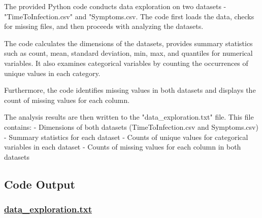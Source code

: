 \documentclass[11pt]{article}
\begin{document}
The provided Python code conducts data exploration on two datasets - "TimeToInfection.csv" and "Symptoms.csv. The code first loads the data, checks for missing files, and then proceeds with analyzing the datasets.

The code calculates the dimensions of the datasets, provides summary statistics such as count, mean, standard deviation, min, max, and quantiles for numerical variables. It also examines categorical variables by counting the occurrences of unique values in each category.

Furthermore, the code identifies missing values in both datasets and displays the count of missing values for each column.

The analysis results are then written to the "data\_exploration.txt" file. This file contains:
- Dimensions of both datasets (TimeToInfection.csv and Symptoms.csv)
- Summary statistics for each dataset
- Counts of unique values for categorical variables in each dataset
- Counts of missing values for each column in both datasets

\subsection{Code Output}\hypertarget{file-data-exploration-txt}{}

\subsubsection*{\hyperlink{code-Data Exploration-data-exploration-txt}{data\_exploration.txt}}
\end{document}

